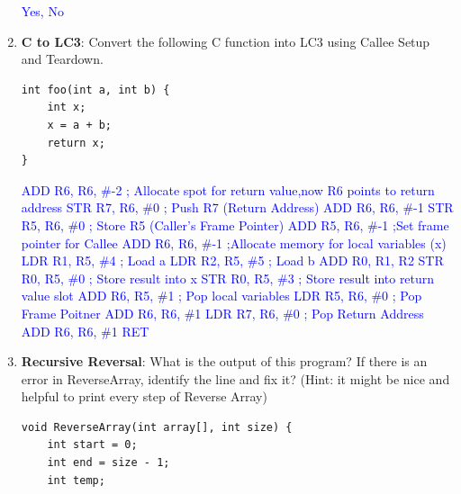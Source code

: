 \documentclass{article}
\begin{document}
\begin{enumerate}[label=(\alph*)]
    \textcolor{blue}{Yes, No}
    \newpage
    \item \textbf{C to LC3}: Convert the following C function into LC3 using Callee Setup and Teardown.
    \begin{lstlisting}[style=CStyle] 
int foo(int a, int b) {
    int x;
    x = a + b;
    return x;
}\end{lstlisting}
    \textcolor{blue}{
    ADD R6, R6, \#-2 \hfill ; Allocate spot for return value,now R6 points to return address\newline
    STR R7, R6, \#0    \hfill ; Push R7 (Return Address) \newline
    ADD R6, R6, \#-1  \newline
    STR R5, R6, \#0    \hfill ; Store R5 (Caller's Frame Pointer) \newline
    ADD R5, R6, \#-1 \hfill ;Set frame pointer for Callee \newline\newline
    ADD R6, R6, \#-1 \hfill ;Allocate memory for local variables (x) \newline
    LDR R1, R5, \#4 \hfill ; Load a \newline 
    LDR R2, R5, \#5 \hfill ; Load b\newline
    ADD R0, R1, R2 \newline 
    STR R0, R5, \#0 \hfill ; Store result into x \newline
    STR R0, R5, \#3 \hfill ; Store result into return value slot \newline\newline
    ADD R6, R5, \#1 \hfill ; Pop local variables\newline
    LDR R5, R6, \#0 \hfill ; Pop Frame Poitner\newline
    ADD R6, R6, \#1 \newline
    LDR R7, R6, \#0 \hfill ; Pop Return Address\newline
    ADD R6, R6, \#1 \newline
    RET
    \newline
}
    \item \textbf{Recursive Reversal}: What is the output of this program? If there is an error in ReverseArray, identify the line and fix it? (Hint: it might be nice and helpful to print every step of Reverse Array)
    
\begin{lstlisting}[style=CStyle] 
void ReverseArray(int array[], int size) {
    int start = 0;
    int end = size - 1;
    int temp;
    

\end{lstlisting}
\end{enumerate}
\end{document}
